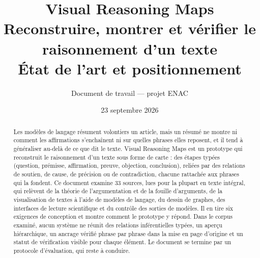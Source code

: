 \documentclass[11pt,a4paper]{article}
\title{Visual Reasoning Maps\\[0.3em]\large Reconstruire, montrer et vérifier le raisonnement d’un texte\\État de l’art et positionnement}
\author{Document de travail — projet ENAC}
\date{23 septembre 2026}
\begin{document}
\maketitle

\begin{abstract}
Les modèles de langage résument volontiers un article, mais un résumé ne montre ni comment les affirmations s’enchaînent ni sur quelles phrases elles reposent, et il tend à généraliser au-delà de ce que dit le texte. Visual Reasoning Maps est un prototype qui reconstruit le raisonnement d’un texte sous forme de carte : des étapes typées (question, prémisse, affirmation, preuve, objection, conclusion), reliées par des relations de soutien, de cause, de précision ou de contradiction, chacune rattachée aux phrases qui la fondent. Ce document examine 33 sources, lues pour la plupart en texte intégral, qui relèvent de la théorie de l’argumentation et de la fouille d’arguments, de la visualisation de textes à l’aide de modèles de langage, du dessin de graphes, des interfaces de lecture scientifique et du contrôle des sorties de modèles. Il en tire six exigences de conception et montre comment le prototype y répond. Dans le corpus examiné, aucun système ne réunit des relations inférentielles typées, un aperçu hiérarchique, un ancrage vérifié phrase par phrase dans la mise en page d’origine et un statut de vérification visible pour chaque élément. Le document se termine par un protocole d’évaluation, qui reste à conduire.
\end{abstract}

\tableofcontents











\printbibliography[heading=bibintoc,title={Références}]
\end{document}
